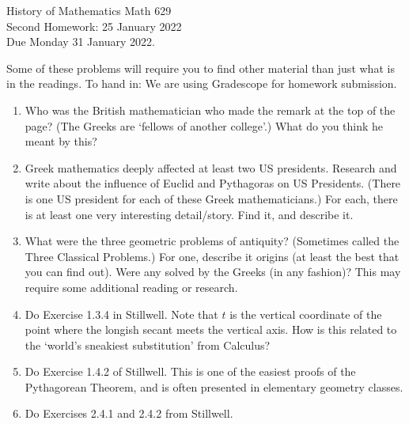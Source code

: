 \documentclass[12pt]{article}
\begin{document}
\LARGE 
\noindent
{\color{Maroon}History of Mathematics \hfill Math 629}\vspace{2pt}\\
\large
Second Homework: \hfill 25 January 2022\\
Due Monday 31 January 2022.
\normalsize\vspace{10pt}

      Some of these problems will require you to find other material than just what is in the readings.
To hand in: We are using Gradescope for homework submission.


\begin{enumerate}

\item    Who was the British mathematician who made the remark at the top of the page?
  (The Greeks are `fellows of another college'.)
  What do you think he meant by this?


\item     Greek mathematics deeply affected at least two US presidents. Research and write about the influence of Euclid and Pythagoras on
  US Presidents. (There is one US president for each of these Greek mathematicians.)
  For each, there is at least one very interesting
  detail/story. Find it, and describe it. 


\item     What were the three geometric problems of antiquity? (Sometimes called the Three Classical Problems.)
  For one, describe it origins (at least the best that you can find out). Were any solved by the Greeks (in any fashion)?
  This may require some additional reading or research.


\item     Do Exercise 1.3.4 in Stillwell. Note that $t$ is the vertical coordinate of the point where the longish secant meets the vertical
  axis. How is this related to the `world's sneakiest substitution' from Calculus? 


\item     Do Exercise 1.4.2 of Stillwell.
  This is one of the easiest proofs of the Pythagorean Theorem, and is often presented in elementary geometry classes.


\item     Do Exercises 2.4.1 and 2.4.2 from Stillwell.


%
%
       
\end{enumerate}
\end{document}
